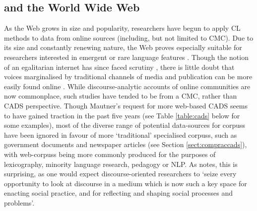 \subsection{ and the World Wide Web} \label{sect:webcorp}



As the Web grows in size and popularity, researchers have begun to apply \gls{CL} methods to data from online sources (including, but not limited to \gls{CMC}). Due to its size and constantly renewing nature, the Web proves especially suitable for researchers interested in emergent or rare language features \cite{fletcher_corpus_2012,koteyko_mining_2010}. Though the notion of an egalitarian internet has since faced scrutiny \cite[see][]{boyd_critical_2012,herring_computer-mediated_1996}, there is little doubt that voices marginalised by traditional channels of media and publication can be more easily found online \cite{chiluwa_social_2012,ryder_affordances_1996}. While discourse\hyp{}analytic accounts of online communities are now commonplace, such studies have tended to be from a \gls{CMC}, rather than \gls{CADS} perspective. Though Mautner's \cite*{mautner_time_2005} request for more web\hyp{}based \gls{CADS} seems to have gained traction in the past five years (see Table \ref{table:cads} below for some examples), most of the diverse range of potential data\hyp{}sources for \glspl{corpus} have been ignored in favour of more `traditional' specialised \glspl{corpus}, such as government documents and newspaper articles (see Section \ref{sect:compraccads}), with web\hyp{}\glspl{corpus} being more commonly produced for the purposes of lexicography, minority language research, pedagogy or \gls{NLP}. As \textcite[p.~810]{mautner_time_2005} notes, this is surprising, as one would expect discourse\hyp{}oriented researchers to `seize every opportunity to look at discourse in a medium which is now such a key space for enacting social practice, and for reflecting and shaping social processes and problems'.

